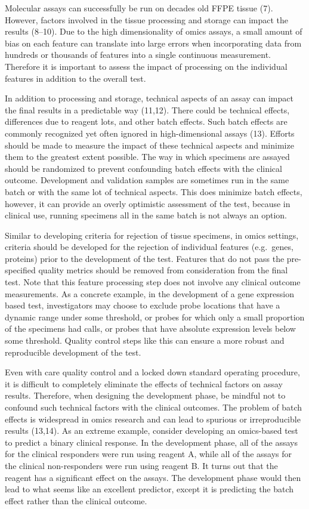 \documentclass[11pt]{article}
\begin{document}
Molecular assays can successfully be run on decades old FFPE tissue (7).
However, factors involved in the tissue processing and storage can
impact the results (8--10). Due to the high dimensionality of omics
assays, a small amount of bias on each feature can translate into large
errors when incorporating data from hundreds or thousands of features
into a single continuous measurement. Therefore it is important to
assess the impact of processing on the individual features in addition
to the overall test.

In addition to processing and storage, technical aspects of an assay can
impact the final results in a predictable way (11,12). There could be
technical effects, differences due to reagent lots, and other batch
effects. Such batch effects are commonly recognized yet often ignored in
high-dimensional assays (13). Efforts should be made to measure the
impact of these technical aspects and minimize them to the greatest
extent possible. The way in which specimens are assayed should be
randomized to prevent confounding batch effects with the clinical
outcome. Development and validation samples are sometimes run in the
same batch or with the same lot of technical aspects. This does minimize
batch effects, however, it can provide an overly optimistic assessment
of the test, because in clinical use, running specimens all in the same
batch is not always an option.

Similar to developing criteria for rejection of tissue specimens, in
omics settings, criteria should be developed for the rejection of
individual features (e.g.~genes, proteins) prior to the development of
the test. Features that do not pass the pre-specified quality metrics
should be removed from consideration from the final test. Note that this
feature processing step does not involve any clinical outcome
measurements. As a concrete example, in the development of a gene
expression based test, investigators may choose to exclude probe
locations that have a dynamic range under some threshold, or probes for
which only a small proportion of the specimens had calls, or probes that
have absolute expression levels below some threshold. Quality control
steps like this can ensure a more robust and reproducible development of
the test.

Even with care quality control and a locked down standard operating
procedure, it is difficult to completely eliminate the effects of
technical factors on assay results. Therefore, when designing the
development phase, be mindful not to confound such technical factors
with the clinical outcomes. The problem of batch effects is widespread
in omics research and can lead to spurious or irreproducible results
(13,14). As an extreme example, consider developing an omics-based test
to predict a binary clinical response. In the development phase, all of
the assays for the clinical responders were run using reagent A, while
all of the assays for the clinical non-responders were run using reagent
B. It turns out that the reagent has a significant effect on the assays.
The development phase would then lead to what seems like an excellent
predictor, except it is predicting the batch effect rather than the
clinical outcome.
\end{document}

